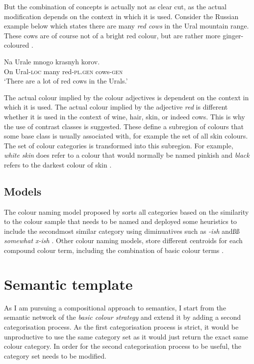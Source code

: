 But the combination of concepts is actually not as clear cut, as the
actual modification depends on the context in which it is
used. Consider the Russian example below which states there are many
\textit{red cows} in the Ural mountain range. These cows are of course not
of a bright red colour, but are rather more ginger-coloured
\citep{tribushinina08cognitive}.

\ea
\gll Na Urale mnogo krasnyh korov.\\
On Ural-\textsc{loc} many red-\textsc{pl.gen} cows-\textsc{gen}\\
\glt `There are a lot of red cows in the Urals.'\\
\z


The actual colour implied by the colour adjectives is dependent on
the context in which it is used. The actual colour implied by the
adjective \textit{red} is different whether it is used in the context of
wine, hair, skin, or indeed cows. This is why the use of contrast
classes is suggested. These define a subregion of colours that some
base class is usually associated with, for example the set of all skin
colours. The set of colour categories is transformed into this
subregion. For example, \textit{white skin} does refer to a colour that
would normally be named pinkish and \textit{black} refers to the darkest
colour of skin \citep{gardenfors04conceptual}.

\subsection{Models}

The colour naming model proposed by
\citeauthor{lammens94computational} sorts all categories based on the
similarity to the colour sample that needs to be named and deployed
some heuristics to include the secondmost similar category using
diminuatives such as \textit{-ish} andßß \textit{somewhat x-ish}
\citep{lammens94computational}. Other colour naming models, store
different centroids for each compound colour term, including the
combination of basic colour terms \citep{mojsilovic05computational}.

\section{Semantic template}
\label{s:ccs-semantic-template}

As I am pursuing a compositional approach to semantics, I start from
the semantic network of the \emph{basic colour strategy} and extend it by
adding a second categorisation process. As the first categorisation
process is strict, it would be unproductive to use the same category
set as it would just return the exact same colour category. In order
for the second categorisation process to be useful, the category set
needs to be modified.


